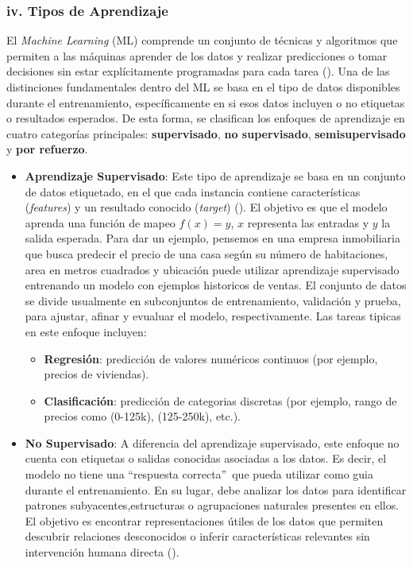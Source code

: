 \documentclass[11pt]{article} %
\begin{document}
\subsubsection{iv. Tipos de Aprendizaje}
El \textit{Machine Learning} (ML) comprende un conjunto de técnicas y algoritmos que permiten a las máquinas aprender de los datos y realizar predicciones o tomar decisiones sin estar explícitamente programadas para cada tarea (\cite{elementosIA}). Una de las distinciones fundamentales dentro del ML se basa en el tipo de datos disponibles durante el entrenamiento, específicamente en si esos datos incluyen o no etiquetas o resultados esperados. De esta forma, se clasifican los enfoques de aprendizaje en cuatro categorías principales: \textbf{supervisado}, \textbf{no supervisado}, \textbf{semisupervisado} y \textbf{por refuerzo}.
\begin{itemize}
    \item \textbf{Aprendizaje Supervisado}: Este tipo de aprendizaje se basa en un conjunto de datos etiquetado, en el que cada instancia contiene características (\textit{features}) y un resultado conocido (\textit{target}) (\cite{choi2020introduction}). El objetivo es que el modelo aprenda una función de mapeo $f(x) = y$, $x$ representa las entradas y $y$ la salida esperada. Para dar un ejemplo, pensemos en una empresa inmobiliaria que busca predecir el precio de una casa según su número de habitaciones, area en metros cuadrados y ubicación puede utilizar aprendizaje supervisado entrenando un modelo con ejemplos historicos de ventas. El conjunto de datos se divide usualmente en subconjuntos de entrenamiento, validación y prueba, para ajustar, afinar y evualuar el modelo, respectivamente. Las tareas tipicas en este enfoque incluyen:
    \begin{itemize}
    \item\textbf{Regresión}: predicción de valores numéricos continuos (por ejemplo, precios de viviendas).
    \item\textbf{Clasificación}: predicción de categorias discretas (por ejemplo, rango de precios como (0-125k), (125-250k), etc.).    
    \end{itemize}
    \item \textbf{No Supervisado}: A diferencia del aprendizaje supervisado, este enfoque no cuenta con etiquetas o salidas conocidas asociadas a los datos. Es decir, el modelo no tiene una \textquotedblleft respuesta correcta\textquotedblright~que pueda utilizar como guia durante el entrenamiento. En su lugar, debe analizar los datos para identificar patrones subyacentes,estructuras o agrupaciones naturales presentes en ellos. El objetivo es encontrar representaciones útiles de los datos que permiten descubrir relaciones desconocidos o inferir características relevantes sin intervención humana directa (\cite{choi2020introduction}). \\[2pt]

\end{itemize}
\end{document}
